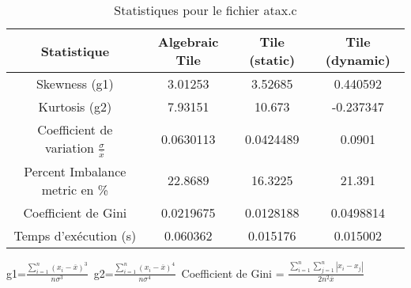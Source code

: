 \documentclass{article}
\begin{document}
\begin{table}[htbp]
  \centering
  \caption{Statistiques pour le fichier atax.c}
  \begin{tabular}{|c|c|c|c|}
    \hline
    Statistique & Algebraic Tile & Tile (static) & Tile (dynamic) \\ 
    \hline
    Skewness (g1)  & 3.01253 & 3.52685 & 0.440592 \\ 
    Kurtosis (g2)  & 7.93151 & 10.673 & -0.237347 \\ 
    Coefficient de variation $ \frac{\sigma}{\overline{x}} $ & 0.0630113 & 0.0424489 & 0.0901\\ 
    Percent Imbalance metric en \% & 22.8689 & 16.3225 & 21.391\\ 
    Coefficient de Gini  & 0.0219675 & 0.0128188 & 0.0498814\\ 
    Temps d'exécution (s) &  0.060362    &  0.015176   &  0.015002   \\ 

    \hline
  \end{tabular}
\end{table}\newline
g1=$ \frac{\sum_{i=1}^{n} (x_i - \overline{x})^3}{n\sigma^3} $\
g2=$ \frac{\sum_{i=1}^{n} (x_i - \overline{x})^4}{n\sigma^4} $\
Coefficient de Gini = $ \frac{\sum_{i=1}^{n}\sum_{j=1}^{n} |x_i - x_j|}{2n^2\overline{x}} $\
\newpage
\end{document}
